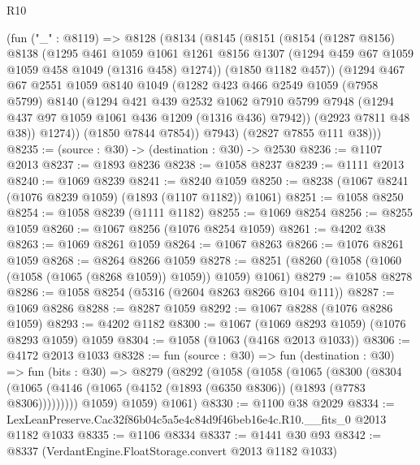 \begin{lexlean}{R10}
\begin{coremodule}
      (fun ("_" : @8119) =>
      @8128
        (@8134
          (@8145
            (@8151
              (@8154
                (@1287 @8156)
                @8138
                (@1295
                  @461
                  @1059
                  @1061
                  @1261
                  @8156
                  @1307
                  (@1294 @459 @67 @1059 @1059 @458 @1049 (@1316 @458) @1274))
                (@1850 @1182 @457))
              (@1294
                @467
                @67
                @2551
                @1059
                @8140
                @1049
                (@1282
                  @423
                  @466
                  @2549
                  @1059
                  (@7958 @5799)
                  @8140
                  (@1294
                    @421
                    @439
                    @2532
                    @1062
                    @7910
                    @5799
                    @7948
                    (@1294 @437 @97 @1059 @1061 @436 @1209 (@1316 @436) @7942))
                  (@2923 @7811 @48 @38))
                @1274))
            (@1850 @7844 @7854))
          @7943)
        (@2827 @7855 @111 @38)))
@8235 := (source : @30) -> (destination : @30) -> @2530
@8236 := @1107 @2013
@8237 := @1893 @8236
@8238 := @1058 @8237
@8239 := @1111 @2013
@8240 := @1069 @8239
@8241 := @8240 @1059
@8250 := @8238 (@1067 @8241 (@1076 @8239 @1059) (@1893 (@1107 @1182)) @1061)
@8251 := @1058 @8250
@8254 := @1058 @8239 (@1111 @1182)
@8255 := @1069 @8254
@8256 := @8255 @1059
@8260 := @1067 @8256 (@1076 @8254 @1059)
@8261 := @4202 @38
@8263 := @1069 @8261 @1059
@8264 := @1067 @8263
@8266 := @1076 @8261 @1059
@8268 := @8264 @8266 @1059
@8278 := @8251 (@8260 (@1058 (@1060 (@1058 (@1065 (@8268 @1059)) @1059)) @1059) @1061)
@8279 := @1058 @8278
@8286 := @1058 @8254 (@5316 (@2604 @8263 @8266 @104 @111))
@8287 := @1069 @8286
@8288 := @8287 @1059
@8292 := @1067 @8288 (@1076 @8286 @1059)
@8293 := @4202 @1182
@8300 := @1067 (@1069 @8293 @1059) (@1076 @8293 @1059) @1059
@8304 := @1058 (@1063 (@4168 @2013 @1033))
@8306 := @4172 @2013 @1033
@8328 := fun (source : @30) =>
  fun (destination : @30) =>
  fun (bits : @30) =>
  @8279
    (@8292
      (@1058
        (@1058
          (@1065
            (@8300
              (@8304 (@1065 (@4146 (@1065 (@4152 (@1893 (@6350 @8306)) (@1893 (@7783 @8306)))))))))
          @1059)
        @1059)
      @1061)
@8330 := @1100 @38 @2029
@8334 := LexLeanPreserve.Cac32f86b04c5a5e4c84d9f46beb16e4c.R10.__fits_0 @2013 @1182 @1033
@8335 := @1106 @8334
@8337 := @1441 @30 @93
@8342 := @8337 (VerdantEngine.FloatStorage.convert @2013 @1182 @1033)

\end{coremodule}
\end{lexlean}
